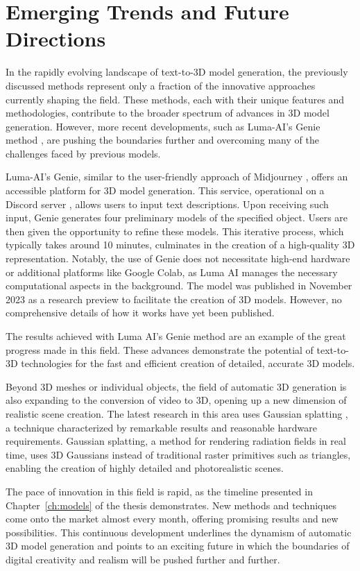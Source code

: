 \section{Emerging Trends and Future Directions}

In the rapidly evolving landscape of text-to-3D model generation, the previously discussed methods represent only a fraction of the innovative approaches currently shaping the field. These methods, each with their unique features and methodologies, contribute to the broader spectrum of advances in 3D model generation. However, more recent developments, such as Luma-AI's Genie method \citep{LumaAIGenie2023}, are pushing the boundaries further and overcoming many of the challenges faced by previous models.

Luma-AI's Genie, similar to the user-friendly approach of Midjourney \citep{Midjourney2023}, offers an accessible platform for 3D model generation. This service, operational on a Discord server \citep{discord}, allows users to input text descriptions. Upon receiving such input, Genie generates four preliminary models of the specified object. Users are then given the opportunity to refine these models. This iterative process, which typically takes around 10 minutes, culminates in the creation of a high-quality 3D representation. Notably, the use of Genie does not necessitate high-end hardware or additional platforms like Google Colab, as Luma AI manages the necessary computational aspects in the background. The model was published in November 2023 as a research preview to facilitate the creation of 3D models. However, no comprehensive details of how it works have yet been published.

The results achieved with Luma AI's Genie method are an example of the great progress made in this field. These advances demonstrate the potential of text-to-3D technologies for the fast and efficient creation of detailed, accurate 3D models.

Beyond 3D meshes or individual objects, the field of automatic 3D generation is also expanding to the conversion of video to 3D, opening up a new dimension of realistic scene creation. The latest research in this area uses Gaussian splatting \citep{kerbl3Dgaussians}, a technique characterized by remarkable results and reasonable hardware requirements. Gaussian splatting, a method for rendering radiation fields in real time, uses 3D Gaussians instead of traditional raster primitives such as triangles, enabling the creation of highly detailed and photorealistic scenes.

The pace of innovation in this field is rapid, as the timeline presented in Chapter~\ref{ch:models} of the thesis demonstrates. New methods and techniques come onto the market almost every month, offering promising results and new possibilities. This continuous development underlines the dynamism of automatic 3D model generation and points to an exciting future in which the boundaries of digital creativity and realism will be pushed further and further.
